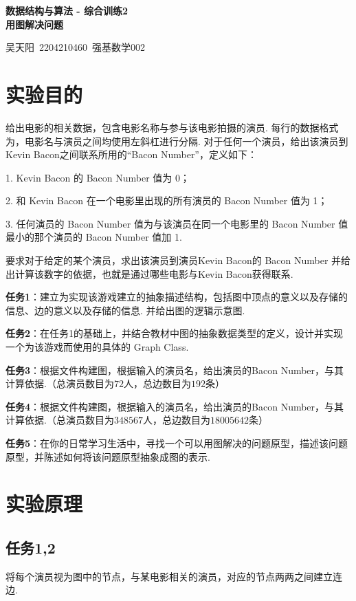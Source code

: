 \documentclass[12pt, a4paper, oneside]{ctexart}
\numberwithin{equation}{section}  %
\newenvironment{myTitle}[1]{
    \begin{center}
    {\zihao{-2}\bf #1\\}
    \zihao{-4}\it
}{\end{center}}  %
\begin{document}
\clearpage
\begin{myTitle}{数据结构与算法 - 综合训练2\\用图解决问题}
    吴天阳\ 2204210460\ 强基数学002
\end{myTitle}
\section{实验目的}
给出电影的相关数据，包含电影名称与参与该电影拍摄的演员. 每行的数据格式为，电影名与演员之间均使用左斜杠进行分隔. 对于任何一个演员，给出该演员到Kevin Bacon之间联系所用的“Bacon Number”，定义如下：

1. Kevin Bacon 的 Bacon Number 值为 0； 

2. 和 Kevin Bacon 在一个电影里出现的所有演员的 Bacon Number 值为 1； 

3. 任何演员的 Bacon Number 值为与该演员在同一个电影里的 Bacon Number 值最小的那个演员的 Bacon Number 值加 1.

要求对于给定的某个演员，求出该演员到演员Kevin Bacon的 Bacon Number 并给出计算该数字的依据，也就是通过哪些电影与Kevin Bacon获得联系.

\textbf{任务1}：建立为实现该游戏建立的抽象描述结构，包括图中顶点的意义以及存储的信息、边的意义以及存储的信息. 并给出图的逻辑示意图.

\textbf{任务2}：在任务1的基础上，并结合教材中图的抽象数据类型的定义，设计并实现一个为该游戏而使用的具体的 Graph Class.

\textbf{任务3}：根据文件构建图，根据输入的演员名，给出演员的Bacon Number，与其计算依据.（总演员数目为$72$人，总边数目为$192$条）

\textbf{任务4}：根据文件构建图，根据输入的演员名，给出演员的Bacon Number，与其计算依据.（总演员数目为$348567$人，总边数目为$18005642$条）

\textbf{任务5}：在你的日常学习生活中，寻找一个可以用图解决的问题原型，描述该问题原型，并陈述如何将该问题原型抽象成图的表示.

\section{实验原理}
\subsection{任务1,2}
将每个演员视为图中的节点，与某电影相关的演员，对应的节点两两之间建立连边.
\end{document}
